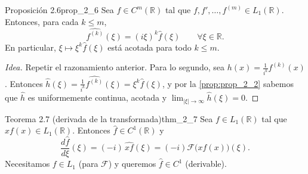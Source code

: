 \begin{proposicion}{Proposición 2.6}{prop_2_6}
Sea $f \in C^m(\mathbb{R})$ tal que $f, f', \dots, f^{(m)} \in L_1(\mathbb{R})$. Entonces, para cada $k \le m$,
\[
\widehat{f^{(k)}}(\xi) = (i\xi)^k\hat{f}(\xi) \qquad \forall\xi \in \mathbb{R}.
\]
En particular, $\xi \mapsto \xi^k\hat{f}(\xi)$ está acotada para todo $k \le m$.
\end{proposicion}

\begin{proof}[Idea]
Repetir el razonamiento anterior. Para lo segundo, sea $h(x) = \frac{1}{i^k}f^{(k)}(x)$. Entonces $\hat{h}(\xi) = \frac{1}{i^k}\widehat{f^{(k)}}(\xi) = \xi^k\hat{f}(\xi)$, y por la \cref{prop:prop_2_2} sabemos que $\hat{h}$ es uniformemente continua, acotada y $\lim_{|\xi|\to\infty}\hat{h}(\xi) = 0$.
\end{proof}

\begin{teorema}{Teorema 2.7 (derivada de la transformada)}{thm_2_7}
Sea $f \in L_1(\mathbb{R})$ tal que $xf(x) \in L_1(\mathbb{R})$. Entonces $\hat{f} \in C^1(\mathbb{R})$ y
\[
\frac{d\hat{f}}{d\xi}(\xi) = (-i)\,\widehat{xf}(\xi) = (-i)\mathcal{F}\big(xf(x)\big)(\xi).
\]
Necesitamos $f \in L_1$ (para $\mathcal{F}$) y queremos $\hat{f} \in C^1$ (derivable).
\end{teorema}

